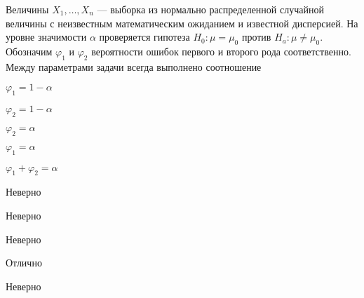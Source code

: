 
\begin{question}
Величины \(X_1,\ldots,X_n\) --- выборка из нормально распределенной
случайной величины с неизвестным математическим ожиданием и известной
дисперсией. На уровне значимости \(\alpha\) проверяется гипотеза
\(H_0: \mu = \mu_0\) против \(H_a: \mu \neq \mu_0\). Обозначим
\(\varphi_1\) и \(\varphi_2\) вероятности ошибок первого и второго рода
соответственно. Между параметрами задачи всегда выполнено соотношение
\begin{answerlist}
  \item \(\varphi_1 = 1 - \alpha\)
  \item \(\varphi_2 = 1 - \alpha\)
  \item \(\varphi_2 = \alpha\)
  \item \(\varphi_1 = \alpha\)
  \item \(\varphi_1 + \varphi_2 = \alpha\)
\end{answerlist}
\end{question}

\begin{solution}
\begin{answerlist}
  \item Неверно
  \item Неверно
  \item Неверно
  \item Отлично
  \item Неверно
\end{answerlist}
\end{solution}

